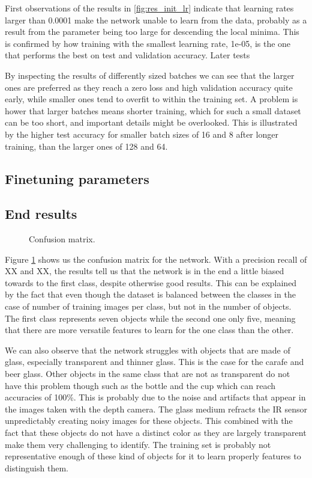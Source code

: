 First observations of the results in \ref{fig:res_init_lr} indicate that learning rates larger than 0.0001 make the network unable to learn from the data, probably as a result from the parameter being too large for descending the local minima. This is confirmed by how training with the smallest learning rate, 1e-05, is the one that performs the best on test and validation accuracy. Later tests

By inspecting the results of differently sized batches we can see that the larger ones are preferred as they reach a zero loss and high validation accuracy quite early, while smaller ones tend to overfit to within the training set. A problem is hower that larger batches means shorter training, which for such a small dataset can be too short, and important details might be overlooked. This is illustrated by the higher test accuracy for smaller batch sizes of 16 and 8 after longer training, than the larger ones of 128 and 64.


\subsection{Finetuning parameters}

\subsection{End results}

\begin{figure}
	
	\caption{Confusion matrix.}
	\label{fig:confusion_matrix}
\end{figure}

Figure \ref{fig:confusion_matrix} shows us the confusion matrix for the network. With a precision recall of XX and XX, the results tell us that the network is in the end a little biased towards to the first class, despite otherwise good results. This can be explained by the fact that even though the dataset is balanced between the classes in the case of number of training images per class, but not in the number of objects. The first class represents seven objects while the second one only five, meaning that there are more versatile features to learn for the one class than the other.

We can also observe that the network struggles with objects that are made of glass, especially transparent and thinner glass. This is the case for the carafe and beer glass. Other objects in the same class that are not as transparent do not have this problem though such as the bottle and the cup which can reach accuracies of 100\%. This is probably due to the noise and artifacts that appear in the images taken with the depth camera. The glass medium refracts the IR sensor unpredictably creating noisy images for these objects. This combined with the fact that these objects do not have a distinct color as they are largely transparent make them very challenging to identify. The training set is probably not representative enough of these kind of objects for it to learn properly features to distinguish them.


